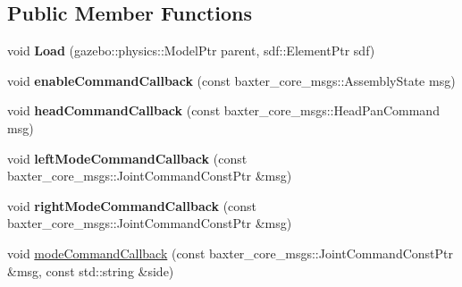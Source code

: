 \subsection*{Public Member Functions}
\begin{DoxyCompactItemize}
\item 
\hypertarget{classbaxter__gazebo__plugin_1_1_baxter_gazebo_ros_control_plugin_ad18708c5af902c198c114c6908c86d66}{void {\bfseries Load} (gazebo\-::physics\-::\-Model\-Ptr parent, sdf\-::\-Element\-Ptr sdf)}\label{classbaxter__gazebo__plugin_1_1_baxter_gazebo_ros_control_plugin_ad18708c5af902c198c114c6908c86d66}

\item 
\hypertarget{classbaxter__gazebo__plugin_1_1_baxter_gazebo_ros_control_plugin_ae142ff05eb7ee5d223939b1ecb41731f}{void {\bfseries enable\-Command\-Callback} (const baxter\-\_\-core\-\_\-msgs\-::\-Assembly\-State msg)}\label{classbaxter__gazebo__plugin_1_1_baxter_gazebo_ros_control_plugin_ae142ff05eb7ee5d223939b1ecb41731f}

\item 
\hypertarget{classbaxter__gazebo__plugin_1_1_baxter_gazebo_ros_control_plugin_abcbb5c7e3d26eb2dadfd03de5070ba47}{void {\bfseries head\-Command\-Callback} (const baxter\-\_\-core\-\_\-msgs\-::\-Head\-Pan\-Command msg)}\label{classbaxter__gazebo__plugin_1_1_baxter_gazebo_ros_control_plugin_abcbb5c7e3d26eb2dadfd03de5070ba47}

\item 
\hypertarget{classbaxter__gazebo__plugin_1_1_baxter_gazebo_ros_control_plugin_aad16fe48445d9dd9b21d3615034e2f37}{void {\bfseries left\-Mode\-Command\-Callback} (const baxter\-\_\-core\-\_\-msgs\-::\-Joint\-Command\-Const\-Ptr \&msg)}\label{classbaxter__gazebo__plugin_1_1_baxter_gazebo_ros_control_plugin_aad16fe48445d9dd9b21d3615034e2f37}

\item 
\hypertarget{classbaxter__gazebo__plugin_1_1_baxter_gazebo_ros_control_plugin_a5d21bace211533c2ea269e10ff7f63aa}{void {\bfseries right\-Mode\-Command\-Callback} (const baxter\-\_\-core\-\_\-msgs\-::\-Joint\-Command\-Const\-Ptr \&msg)}\label{classbaxter__gazebo__plugin_1_1_baxter_gazebo_ros_control_plugin_a5d21bace211533c2ea269e10ff7f63aa}

\item 
void \hyperlink{classbaxter__gazebo__plugin_1_1_baxter_gazebo_ros_control_plugin_aff0207bdb9a7d00b791ce5edc6ee27b9}{mode\-Command\-Callback} (const baxter\-\_\-core\-\_\-msgs\-::\-Joint\-Command\-Const\-Ptr \&msg, const std\-::string \&side)
\end{DoxyCompactItemize}


